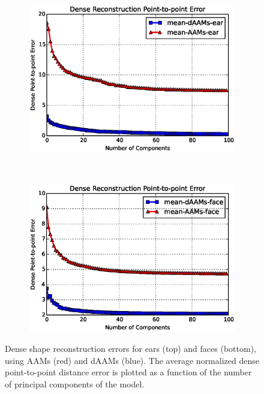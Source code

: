 \begin{figure}[!b]
    \centering
    \begin{subfigure}[b]{0.43\textwidth}
            \includegraphics[width=\textwidth]{Suplementory_Meterial/Model_Analysis/sr_ear}
    \end{subfigure}
    \\
    \begin{subfigure}[b]{0.43\textwidth}
            \includegraphics[width=\textwidth]{Suplementory_Meterial/Model_Analysis/sr_face}
    \end{subfigure}
    \caption{Dense shape reconstruction errors for ears (top) and faces (bottom), using AAMs (red) and dAAMs (blue). The average normalized dense point-to-point distance error is plotted as a function of the number of principal components of the model.}
    \label{fig:rc_face}
\end{figure}






